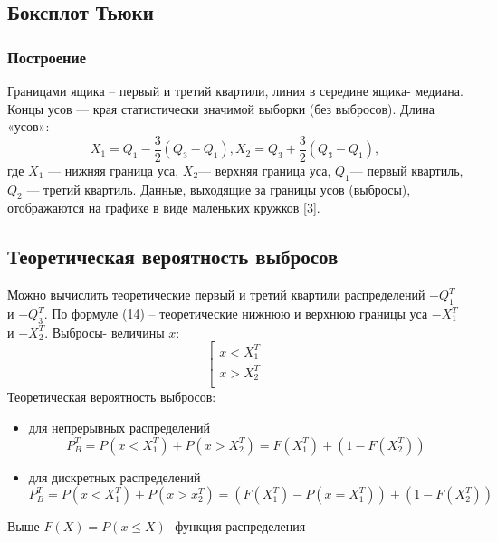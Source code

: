 \subsection{Боксплот Тьюки}
	\subsubsection{Построение}
	\noindent Границами ящика – первый и третий квартили, линия в середине ящика- медиана. Концы усов — края статистически значимой выборки (без выбросов). Длина «усов»:
	\begin{equation}
	    {X_1 = Q_1} - \frac{3}{2}{(Q_3 - Q_1)}, {X_2 = Q_3} + \frac{3}{2}{(Q_3 - Q_1)},
	\end{equation}
    где $X_1$ — нижняя граница уса, $X_2$— верхняя граница уса, $Q_1$— первый
    квартиль, $Q_2$ — третий квартиль.
    Данные, выходящие за границы усов (выбросы), отображаются на графике в виде маленьких кружков [3].

	\subsection{Теоретическая вероятность выбросов}
	\noindent Можно вычислить теоретические первый и третий квартили распределений $-Q_1^T$ и $-Q_3^T$.  По формуле (14) – теоретические нижнюю и верхнюю границы уса $-X_1^T$ и $-X_2^T$. Выбросы- величины $x$:
	    \begin{equation}
		    \left[
		    \begin{gathered}
		    x < X_1^T \\
		    x > X_2^T \\
		    \end{gathered}
		    \right.
	    \end{equation}
	Теоретическая вероятность выбросов:
	\begin{itemize}
	    \item для непрерывных распределений
	    \begin{equation}
		    P_B^T = P(x<X_1^T) + P(x>X_2^T)=F(X_1^T) + (1-F(X_2^T))
	    \end{equation}
	    \item для дискретных распределений
	    \begin{equation}
		    P_B^T = P(x<X_1^T)+P(x>x_2^T)=(F(X_1^T)-P(x=X_1^T))+(1-F(X_2^T))
	    \end{equation}
	\end{itemize}
	Выше $F(X) = P(x\leq{X})$- функция распределения